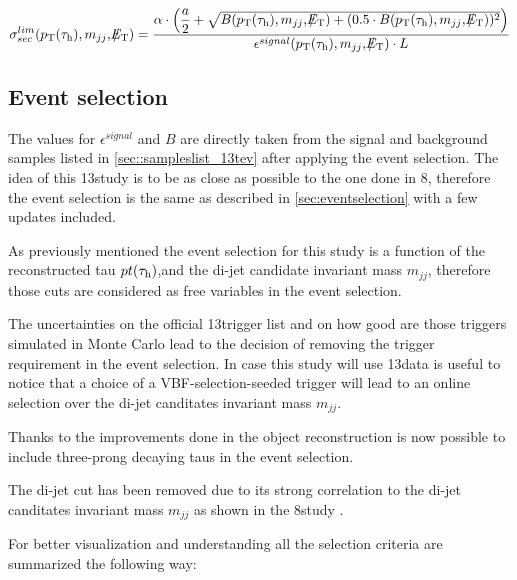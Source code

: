 \begin{equation}
\sigma^{lim}_{sec}( \pt(\hadtau) , m_{jj} ,  \met ) = \dfrac{\alpha \cdot\left(\dfrac{a}{2} + \sqrt{B( \pt(\hadtau) , m_{jj} ,  \met ) + (0.5 \cdot B( \pt(\hadtau) , m_{jj} ,  \met ))^{2}}\right)}{\epsilon^{signal} ( \pt(\hadtau) , m_{jj} ,  \met ) \cdot L}
\label{eq::xsec_lim}
\end{equation}



\subsection{Event selection}
\label{subsec::event_sel_13tev}

The values for $\epsilon^{signal}$ and $B$ are directly taken from the signal and background samples listed in \autoref{sec::sampleslist_13tev} after applying the event selection. The idea of this 13\tev study is to be as close as possible to the one done in 8\tev, therefore the event selection is the same as described in \autoref{sec:eventselection} with a few updates included.

As previously mentioned the event selection for this study is a function of the reconstructed tau $pt(\tau_{\text{h}})$,\met and the di-jet candidate invariant mass $m_{jj}$, therefore those cuts are considered as free variables in the event selection. 

The uncertainties on the official 13\tev trigger list and on how good are those triggers simulated in Monte Carlo lead to the decision of removing the trigger requirement in the event selection. In case this study will use 13\tev data is useful to notice that a choice of a VBF-selection-seeded trigger will lead to an online selection over the di-jet canditates invariant mass $m_{jj}$.

Thanks to the improvements done in the \hadtau object reconstruction is now possible to include three-prong decaying taus in the event selection.

The di-jet \deltaeta cut has been removed due to its strong correlation to the di-jet canditates invariant mass $m_{jj}$ as shown in the 8\tev study \cite{Khachatryan:2015kxa}.

For better visualization and understanding all the selection criteria are summarized the following way:

